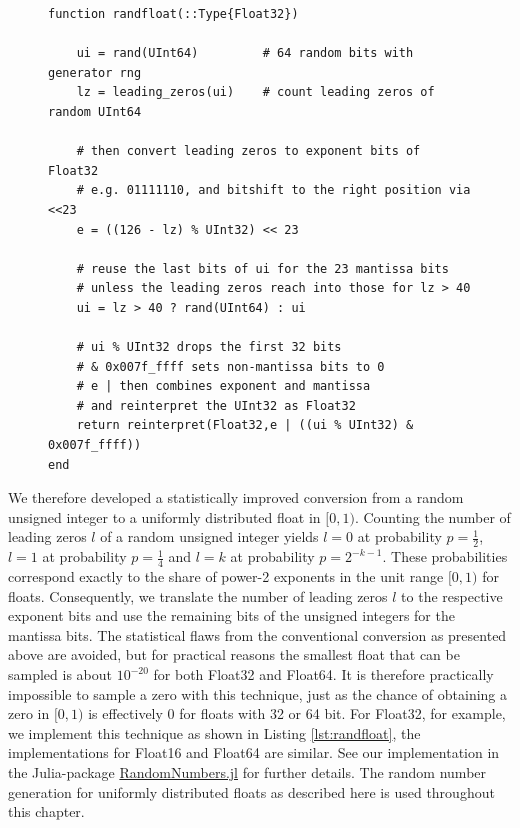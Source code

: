 \begin{figure}[tbhp]
\begin{lstlisting}[language=JuliaLocal,label=lst:randfloat,caption={\textbf{An improved random number generator (RNG) for uniformly
distributed floats.} The Julia function \texttt{randfloat} takes a number format as argument (here only the version for Float32 is presented).
\texttt{\%} is the remainder after division, for unsigned integers effectively converting between unsigned integers by adding leading
zeros or discarding leading bits. \texttt{?} indicates a one-line if-clause. \texttt{\&} is the bitwise logical and-operation. \texttt{$\vert$}
is the bitwise logical or-operation.}]
function randfloat(::Type{Float32})

    ui = rand(UInt64)         # 64 random bits with generator rng
    lz = leading_zeros(ui)    # count leading zeros of random UInt64

    # then convert leading zeros to exponent bits of Float32
    # e.g. 01111110, and bitshift to the right position via <<23
    e = ((126 - lz) % UInt32) << 23

    # reuse the last bits of ui for the 23 mantissa bits
    # unless the leading zeros reach into those for lz > 40
    ui = lz > 40 ? rand(UInt64) : ui

    # ui % UInt32 drops the first 32 bits
    # & 0x007f_ffff sets non-mantissa bits to 0
    # e | then combines exponent and mantissa
    # and reinterpret the UInt32 as Float32
    return reinterpret(Float32,e | ((ui % UInt32) & 0x007f_ffff))
end
\end{lstlisting}
\end{figure}

We therefore developed a statistically improved conversion from a random unsigned integer to a uniformly distributed
float in $[0,1)$. Counting the number of leading zeros $l$ of a random unsigned integer yields $l = 0$ at probability
$p = \tfrac{1}{2}$, $l=1$ at probability $p=\tfrac{1}{4}$ and $l = k$ at probability $p=2^{-k-1}$. These probabilities
correspond exactly to the share of power-2 exponents in the unit range $[0,1)$ for floats.
Consequently, we translate the number of leading zeros $l$  to the respective exponent bits and use the remaining
bits of the unsigned integers for the mantissa bits. The statistical flaws from the conventional conversion as presented
above are avoided, but for practical reasons the smallest float that can be sampled is about $10^{-20}$ for both Float32
and Float64. It is therefore practically impossible to sample a zero with this technique, just as the chance of obtaining a
zero in $[0,1)$ is effectively 0 for floats with 32 or 64 bit. For Float32, for example, we implement this technique as shown
in Listing \ref{lst:randfloat}, the implementations for Float16 and Float64 are similar. See our implementation in the Julia-package
\href{https://github.com/JuliaRandom/RandomNumbers.jl}{RandomNumbers.jl} for further details. The random number generation
for uniformly distributed floats as described here is used throughout this chapter.

